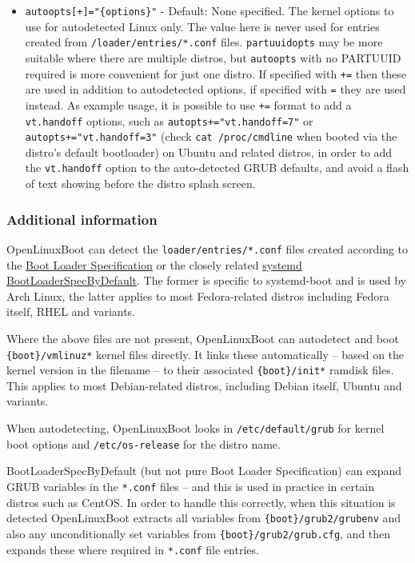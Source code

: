 \documentclass[]{article}
\begin{document}
\begin{itemize}
	\item \texttt{autoopts[+]="\{options\}"} - Default: None specified. The kernel options to use
  for autodetected Linux only. The value here is never used for entries created from
  \texttt{/loader/entries/*.conf} files. \texttt{partuuidopts} may be more suitable where there are multiple
  distros, but \texttt{autoopts} with no PARTUUID required is more convenient for just one distro.
  If specified with \texttt{+=} then these are used in addition to autodetected options, if specified
  with \texttt{=} they are used instead. As example usage, it is possible to use \texttt{+=} format to add
  a \texttt{vt.handoff} options, such as \texttt{autopts+="vt.handoff=7"} or \texttt{autopts+="vt.handoff=3"}
  (check \texttt{cat /proc/cmdline} when booted via the distro's default bootloader) on Ubuntu and related distros,
  in order to add the \texttt{vt.handoff} option to the auto-detected GRUB defaults, and avoid a flash of text
  showing before the distro splash screen.
  \medskip
\end{itemize}

\subsubsection{Additional information}

OpenLinuxBoot can detect the \texttt{loader/entries/*.conf} files created according to the
\href{https://systemd.io/BOOT_LOADER_SPECIFICATION/}{Boot Loader Specification} or the closely related
\href{https://fedoraproject.org/wiki/Changes/BootLoaderSpecByDefault}{systemd BootLoaderSpecByDefault}. The
former is specific to systemd-boot and is used by Arch Linux, the latter applies to most Fedora-related distros
including Fedora itself, RHEL and variants.

Where the above files are not present, OpenLinuxBoot can autodetect and
boot \texttt{\{boot\}/vmlinuz*} kernel files directly. It links these automatically -- based on the
kernel version in the filename -- to their associated \texttt{\{boot\}/init*} ramdisk files.
This applies to most Debian-related distros, including Debian itself, Ubuntu and variants.

When autodetecting, OpenLinuxBoot looks in \texttt{/etc/default/grub} for kernel boot options and
\texttt{/etc/os-release} for the distro name.

BootLoaderSpecByDefault (but not pure Boot Loader Specification) can expand GRUB variables
in the \texttt{*.conf} files -- and this is used in practice in certain distros such as CentOS.
In order to handle this correctly, when this situation is detected OpenLinuxBoot extracts all variables from
\texttt{\{boot\}/grub2/grubenv} and also any unconditionally set variables from
\texttt{\{boot\}/grub2/grub.cfg}, and then expands these where required in \texttt{*.conf} file entries.
\end{document}
